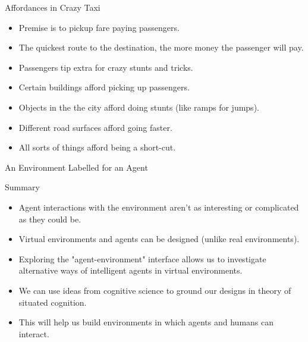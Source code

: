 \documentclass[aspectratio=1610,xcolor=dvipsnames,t]{beamer}
\begin{document}
\begin{frame}{Affordances in Crazy Taxi} 
    \begin{itemize}
        \item Premise is to pickup fare paying passengers.
        \item The quickest route to the destination, the more
              money the passenger will pay.
        \item Passengers tip extra for crazy stunts and tricks.
        \item Certain buildings afford picking up passengers.
        \item Objects in the the city afford doing stunts 
              (like ramps for jumps).
        \item Different road surfaces afford going faster.
        \item All sorts of things afford being a short-cut.
    \end{itemize}
\end{frame} 

\begin{frame}{An Environment Labelled for an Agent} 
\end{frame} 

\begin{frame}{Summary}
    \begin{itemize}
        \item Agent interactions with the environment aren't
              as interesting or complicated as they could be.
        \item Virtual environments and agents can be designed
              (unlike real environments).
        \item Exploring the "agent-environment" interface allows
              us to investigate alternative ways of intelligent
              agents in virtual environments.
        \item We can use ideas from cognitive science to  
              ground our designs in theory of situated cognition.
        \item This will help us build environments in which agents
              and humans can interact. 
    \end{itemize}
\end{frame} 
\end{document}
